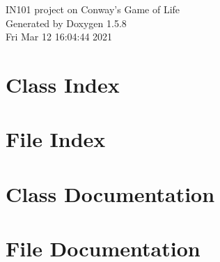 \documentclass[a4paper]{book}
\begin{document}
\begin{titlepage}
\vspace*{7cm}
\begin{center}
{\Large IN101 project on Conway's Game of Life }\\
\vspace*{1cm}
{\large Generated by Doxygen 1.5.8}\\
\vspace*{0.5cm}
{\small Fri Mar 12 16:04:44 2021}\\
\end{center}
\end{titlepage}
\clearemptydoublepage
{}
\tableofcontents
\clearemptydoublepage
{}
\chapter{Class Index}

\chapter{File Index}

\chapter{Class Documentation}

\chapter{File Documentation}








\printindex
\end{document}
